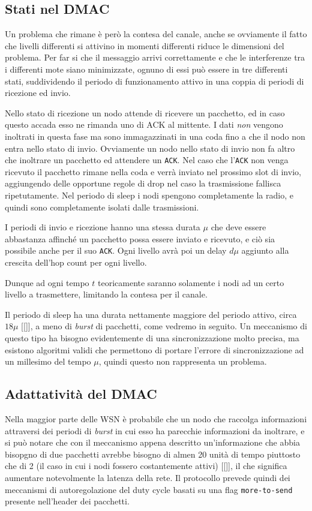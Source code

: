 \documentclass[pdftex,12pt,a4paper,italian]{article}
\begin{document}
\subsection{Stati nel DMAC}
Un problema che rimane è però la contesa del canale, anche se ovviamente il fatto che livelli 
differenti si attivino in momenti differenti riduce le dimensioni del problema.
Per far si che il messaggio arrivi correttamente e che le interferenze tra i differenti 
mote siano minimizzate, ognuno di essi può essere in tre differenti stati, suddividendo il 
periodo di funzionamento attivo in una coppia di periodi di ricezione ed invio. 

Nello stato di ricezione un nodo attende di ricevere un pacchetto, ed in caso questo accada 
esso ne rimanda uno di ACK al mittente. I dati \emph{non} vengono inoltrati in questa fase ma 
sono immagazzinati in una coda fino a che il nodo non entra nello stato di invio.
Ovviamente un nodo nello stato di invio non fa altro che inoltrare un pacchetto ed attendere un 
\texttt{ACK}. Nel caso che l'\texttt{ACK}  non venga ricevuto il pacchetto rimane nella coda e 
verrà inviato nel prossimo slot di invio, aggiungendo delle opportune regole di drop nel caso 
la trasmissione fallisca ripetutamente. 
Nel periodo di sleep i nodi spengono completamente la radio, e quindi sono completamente isolati dalle trasmissioni. 

I periodi di invio e ricezione hanno una stessa durata $\mu$ che deve essere abbastanza affinché 
un pacchetto possa essere inviato e ricevuto, e ciò sia possibile anche per il suo \texttt{ACK}.
Ogni livello avrà poi un delay $d\mu$ aggiunto alla crescita dell'hop count per ogni livello. 
 
Dunque ad ogni tempo $t$ teoricamente saranno solamente i nodi ad un certo livello a 
trasmettere, limitando la contesa per il canale. 

Il periodo di sleep ha una durata nettamente maggiore del periodo attivo, circa $18\mu$ [[]], a meno di \emph{burst} di pacchetti, come vedremo in seguito.
Un meccanismo di questo tipo ha bisogno evidentemente di una sincronizzazione molto precisa, ma 
esistono algoritmi validi che permettono di portare l'errore di sincronizzazione ad un millesimo 
del tempo $\mu$, quindi questo non rappresenta un problema. 

\subsection{Adattatività del DMAC}
Nella maggior parte delle WSN è probabile che un nodo che raccolga informazioni attraversi dei
periodi di \emph{burst} in cui esso ha parecchie informazioni da inoltrare, e si può notare che 
con il meccanismo appena descritto un'informazione che abbia bisopgno di due pacchetti avrebbe 
bisogno di almen 20 unità di tempo piuttosto che di 2 (il caso in cui i nodi fossero 
costantemente attivi) [[]], il che significa aumentare notevolmente la latenza della rete. 
Il protocollo prevede quindi dei meccanismi di autoregolazione del duty cycle basati su una flag 
\texttt{more-to-send} presente nell'header dei pacchetti.
\end{document}
